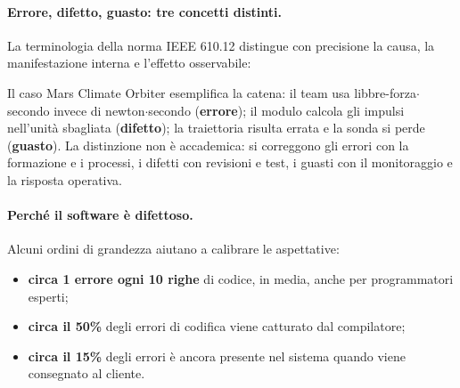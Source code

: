\documentclass[12pt]{extarticle}
\begin{document}
\paragraph{Errore, difetto, guasto: tre concetti distinti.}
La terminologia della norma IEEE 610.12 distingue con precisione la causa, la manifestazione interna e l'effetto osservabile:

\begin{center}
\end{center}

\noindent Il caso Mars Climate Orbiter esemplifica la catena: il team usa libbre-forza$\cdot$secondo invece di newton$\cdot$secondo (\textbf{errore}); il modulo calcola gli impulsi nell'unità sbagliata (\textbf{difetto}); la traiettoria risulta errata e la sonda si perde (\textbf{guasto}). La distinzione non è accademica: si correggono gli errori con la formazione e i processi, i difetti con revisioni e test, i guasti con il monitoraggio e la risposta operativa.

\paragraph{Perché il software è difettoso.}
Alcuni ordini di grandezza aiutano a calibrare le aspettative:

\begin{itemize}
    \item \textbf{circa 1 errore ogni 10 righe} di codice, in media, anche per programmatori esperti;
    \item \textbf{circa il 50\%} degli errori di codifica viene catturato dal compilatore;
    \item \textbf{circa il 15\%} degli errori è ancora presente nel sistema quando viene consegnato al cliente.
\end{itemize}
\end{document}
